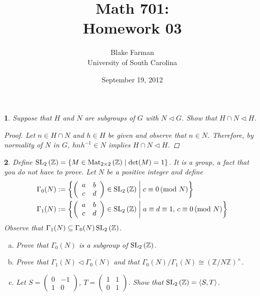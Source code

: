 \documentclass[10pt]{amsart}
\author{Blake Farman\\University of South Carolina}
\title{Math 701:\\Homework 03}
\date{September 19, 2012}
\begin{document}
\maketitle

\newtheorem{thm}{}
\newtheorem{lem}{Lemma}

\begin{thm}
  Suppose that $H$ and $N$ are subgroups of $G$ with $N \lhd G$.
  Show that $H \cap N \lhd H$.
  \begin{proof}
    Let $n \in H \cap N$ and $h \in H$ be given and observe that $n \in N$.
    Therefore, by normality of $N$ in $G$, $hnh^{-1} \in N$ implies $H \cap N \lhd H$.
  \end{proof}
\end{thm}

\begin{thm}
  Define $\operatorname{SL}_{2}\left(\mathbb{Z}\right) = \left\{ M \in \operatorname{Mat}_{2 \times 2}\left(\mathbb{Z}\right) \mid \det(M) = 1 \right\}$.
  It is a group, a fact that you do not have to prove.
  Let $N$ be a positive integer and define
  \begin{align*}
    \Gamma_0(N) & := \left\{ \left(
    \begin{array}{cc}
      a & b\\
      c & d
    \end{array}
    \right) \in \operatorname{SL}_{2}\left(\mathbb{Z}\right)
    \;\middle\vert\; c \equiv 0\, (\text{mod } N)
    \right\}\\
    \Gamma_1(N) & := \left\{ \left(
    \begin{array}{cc}
      a & b\\
      c & d
    \end{array}
    \right) \in \operatorname{SL}_{2}\left(\mathbb{Z}\right)
    \;\middle\vert\; a \equiv d \equiv 1,\, c \equiv 0\, (\text{mod } N)
    \right\}\\
  \end{align*}
  Observe that $\Gamma_1(N) \subseteq \Gamma_0(N) \operatorname{SL}_{2}\left(\mathbb{Z}\right)$.
  \begin{enumerate}[(a)]
  \item
    Prove that $\Gamma_0(N)$ is a subgroup of $\operatorname{SL}_{2}\left(\mathbb{Z}\right)$.
  \item
    Prove that $\Gamma_1(N) \lhd \Gamma_0(N)$ and that $\Gamma_0(N) / \Gamma_1(N) \cong (\mathbb{Z}/N\mathbb{Z})^{\times}$.
  \item
    Let $S = \left(
    \begin{array}{cc}
      0 & -1\\
      1 & 0
    \end{array}
    \right)$,
    $T = \left(
    \begin{array}{cc}
      1 & 1\\
      0 & 1
    \end{array}
    \right)$.
    Show that $\operatorname{SL}_{2}\left(\mathbb{Z}\right) = \left<S,T\right>$.
  \end{enumerate}
  

\end{thm}
\end{document}
